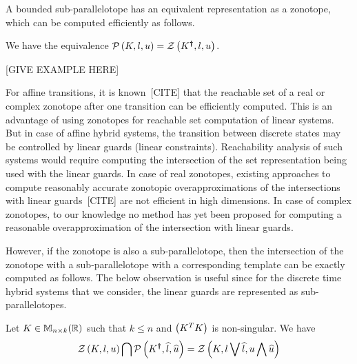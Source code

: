 A bounded sub-parallelotope has an equivalent representation as a
zonotope, which can be computed efficiently as follows.
\begin{lemma}
We have the equivalence $\mathcal{P}\left(K,l,u\right)=\mathcal{Z}\left(K^{\bm{\dagger}},l,u\right)$.
\end{lemma}
[GIVE EXAMPLE HERE]



For affine transitions, it is known~[CITE] that the reachable set of a
real or complex zonotope after one transition can be efficiently
computed.  This is an advantage of using zonotopes for reachable set
computation of linear systems.  But in case of affine hybrid
systems, the transition between discrete states may be controlled by
linear guards (linear constraints).  Reachability analysis of such
systems would require computing the intersection of the set
representation being used with the linear guards.  In case of real
zonotopes, existing approaches to compute reasonably accurate
zonotopic overapproximations of the intersections with linear
guards~[CITE] are not efficient in high dimensions.  In case of
complex zonotopes, to our knowledge no method has yet been proposed
for computing a reasonable overapproximation of the intersection with
linear guards.

However, if the zonotope is also a sub-parallelotope, then the
intersection of 
the zonotope with a sub-parallelotope with a corresponding template can be
exactly computed as follows. The below observation is useful since for
the discrete time hybrid systems that we consider, the linear guards
are represented as sub-parallelotopes.
%
\begin{lemma}\label{lem:motivation}
Let $K\in\mathbb{M}_{n\times k}(\mathbb{R})$ such that $k\leq n$ and $\left(K^TK\right)$ is
non-singular.  We have
\[
\mathcal{Z}\left(K,l,u\right) \bigcap \mathcal{P}\left(K^{\bm{\dagger}},\widehat{l},\widehat{u}\right)
= \mathcal{Z}\left(K,l\bigvee \widehat{l},u\bigwedge \widehat{u}\right)
\]
\end{lemma}
%

